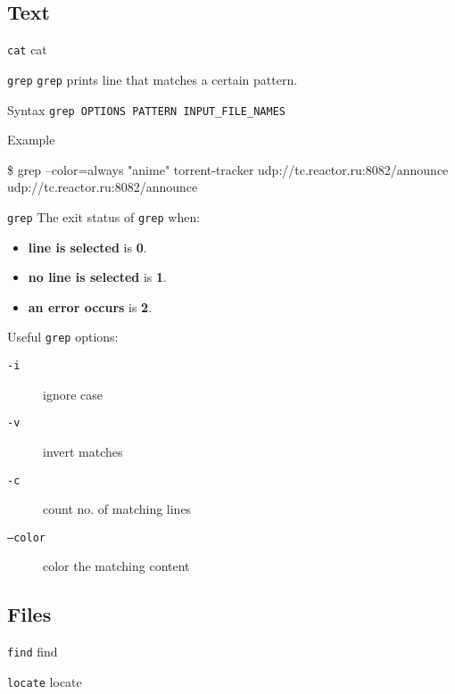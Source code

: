 \documentclass[11pt]{beamer}
\begin{document}
		\subsection{Text}
			\begin{frame}{\texttt{cat}}
				cat
			\end{frame}
			\begin{frame}[fragile]{\texttt{grep}}
					\texttt{grep} prints line that matches a certain pattern.
						\begin{alertblock}{Syntax}
							\texttt{grep OPTIONS PATTERN INPUT\_FILE\_NAMES}
						\end{alertblock}
						\begin{exampleblock}{Example}
							\begin{semiverbatim}
\$ grep --color=always "anime" torrent-tracker
udp://tc.{\textbf{\color{red}{anime}}}reactor.ru:8082/announce
udp://tc.{\textbf{\color{red}{anime}}}reactor.ru:8082/announce \end{semiverbatim}	
						\end{exampleblock}
			\end{frame}
			\begin{frame}[t, fragile]{\texttt{grep}}
				The exit status of \texttt{grep} when:
				\begin{itemize}
					\item \textbf{line is selected} is \textbf{0}.
					\item \textbf{no line is selected} is \textbf{1}.
					\item \textbf{an error occurs} is \textbf{2}.
				\end{itemize}
				Useful \texttt{grep} options:
				\begin{description}
					\item[\texttt{-i}] ignore case
					\item[ \texttt{-v}] invert matches
					\item[ \texttt{-c}] count no. of matching lines
					\item[ \texttt{--color}] color the matching content
				\end{description}
			\end{frame}
		\subsection{Files}
			\begin{frame}{ \texttt{find}}
				find
			\end{frame}
			\begin{frame}{ \texttt{locate}}
				locate
			\end{frame}
	
\end{document}
